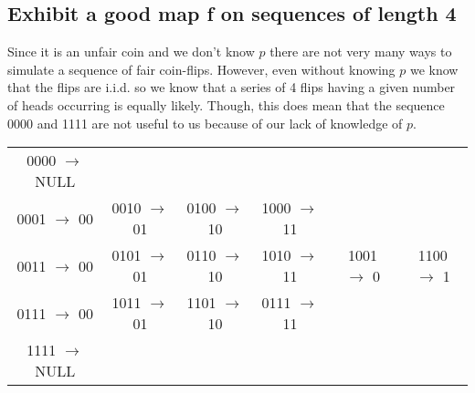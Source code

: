 \documentclass[11pt, oneside]{book}   	%
\begin{document}
\subsection{Exhibit a good map f on sequences of length 4}
Since it is an unfair coin and we don't know $p$ there are not very many ways to simulate a sequence of fair coin-flips.  However, even without knowing $p$ we know that the flips are i.i.d. so we know that a series of 4 flips having a given number of heads occurring is equally likely.  Though, this does mean that the sequence 0000 and 1111 are not useful to us because of our lack of knowledge of $p$.
\begin{center}
\begin{tabular}{ c | c | c | c | c | c |}
0000 $\rightarrow$ NULL & & & & & \\
0001 $\rightarrow$ 00 & 0010 $\rightarrow$ 01 & 0100 $\rightarrow$ 10 & 1000 $\rightarrow$ 11 & & \\
0011 $\rightarrow$ 00 & 0101 $\rightarrow$ 01 & 0110 $\rightarrow$ 10 & 1010 $\rightarrow$ 11 & 1001 $\rightarrow$ 0 & 1100 $\rightarrow$ 1 \\
0111 $\rightarrow$ 00 & 1011 $\rightarrow$ 01 & 1101 $\rightarrow$ 10 & 0111 $\rightarrow$ 11 & & \\
1111 $\rightarrow$ NULL & & & & &
\end{tabular}
\end{center}
\end{document}
